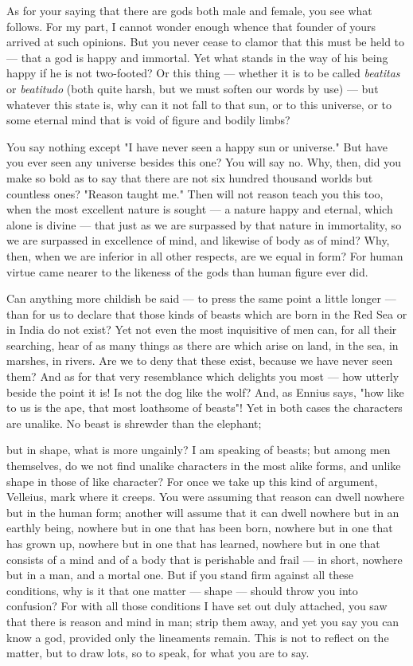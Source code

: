  As for your saying that there are gods both male and female, you see what follows. For my part, I cannot wonder enough whence that founder of yours arrived at such opinions. But you never cease to clamor that this must be held to — that a god is happy and immortal. Yet what stands in the way of his being happy if he is not two-footed? Or this thing — whether it is to be called \textit{beatitas} or \textit{beatitudo} (both quite harsh, but we must soften our words by use) — but whatever this state is, why can it not fall to that sun, or to this universe, or to some eternal mind that is void of figure and bodily limbs?

 You say nothing except "I have never seen a happy sun or universe." But have you ever seen any universe besides this one? You will say no. Why, then, did you make so bold as to say that there are not six hundred thousand worlds but countless ones? "Reason taught me." Then will not reason teach you this too, when the most excellent nature is sought — a nature happy and eternal, which alone is divine — that just as we are surpassed by that nature in immortality, so we are surpassed in excellence of mind, and likewise of body as of mind? Why, then, when we are inferior in all other respects, are we equal in form? For human virtue came nearer to the likeness of the gods than human figure ever did.

 Can anything more childish be said — to press the same point a little longer — than for us to declare that those kinds of beasts which are born in the Red Sea or in India do not exist? Yet not even the most inquisitive of men can, for all their searching, hear of as many things as there are which arise on land, in the sea, in marshes, in rivers. Are we to deny that these exist, because we have never seen them? And as for that very resemblance which delights you most — how utterly beside the point it is! Is not the dog like the wolf? And, as Ennius says, "how like to us is the ape, that most loathsome of beasts"! Yet in both cases the characters are unalike. No beast is shrewder than the elephant;

 but in shape, what is more ungainly? I am speaking of beasts; but among men themselves, do we not find unalike characters in the most alike forms, and unlike shape in those of like character? For once we take up this kind of argument, Velleius, mark where it creeps. You were assuming that reason can dwell nowhere but in the human form; another will assume that it can dwell nowhere but in an earthly being, nowhere but in one that has been born, nowhere but in one that has grown up, nowhere but in one that has learned, nowhere but in one that consists of a mind and of a body that is perishable and frail — in short, nowhere but in a man, and a mortal one. But if you stand firm against all these conditions, why is it that one matter — shape — should throw you into confusion? For with all those conditions I have set out duly attached, you saw that there is reason and mind in man; strip them away, and yet you say you can know a god, provided only the lineaments remain. This is not to reflect on the matter, but to draw lots, so to speak, for what you are to say.

